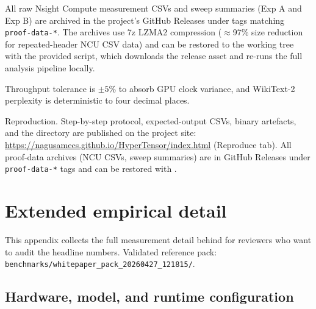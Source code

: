 \documentclass[11pt]{article}
\begin{document}
All raw Nsight Compute measurement CSVs and sweep summaries (Exp A and Exp B)
are archived in the project's GitHub Releases under tags matching
\texttt{proof-data-*}. The archives use 7z LZMA2 compression ($\approx$97\%
size reduction for repeated-header NCU CSV data) and can be restored to the
working tree with the provided 
script, which downloads the release asset and re-runs the full analysis
pipeline locally.

Throughput tolerance is $\pm 5\%$ to absorb GPU clock variance, and
WikiText-2 perplexity is deterministic to four decimal places.

\smallskip\noindent Reproduction.
Step-by-step protocol, expected-output CSVs, binary artefacts, and
the  directory are published on the project site:
\url{https://nagusamecs.github.io/HyperTensor/index.html} (Reproduce tab).
All proof-data archives (NCU CSVs, sweep summaries) are in GitHub Releases
under \texttt{proof-data-*} tags and can be restored with
.

\appendix

\section{Extended empirical detail}
\label{app:extended}

This appendix collects the full measurement detail behind
 for reviewers who want to
audit the headline numbers. Validated reference pack:
\texttt{benchmarks/whitepaper\_pack\_20260427\_121815/}.

\subsection{Hardware, model, and runtime configuration}
\end{document}
